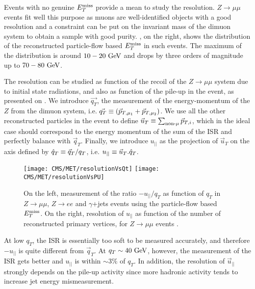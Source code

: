     Events with no genuine $E_T^\text{miss}$ provide a mean to study the resolution.
    $Z \rightarrow \mu\mu$ events fit well this purpose as muons are well-identified objects
    with a good resolution and a constraint can be put on the invariant mass of the
    dimuon system to obtain a sample with good purity. ,
    on the right, shows the distribution of the reconstructed particle-flow based
    $E_T^\text{miss}$ in such events. The maximum of the distribution is around $10-20~\text{GeV}$ and
    drops by three orders of magnitude up to $70-80~\text{GeV}$.

    The resolution can be studied as function of the recoil of the $Z \rightarrow \mu\mu$
    system due to initial state radiations, and also as function of the pile-up in the
    event, as presented on . We introduce $\vec{q_T}$,
    the measurement of the energy-momentum of the $Z$ from the dimuon system, i.e.
    $\vec{q_T} \equiv (\vec{p}_{T,\mu_1} + \vec{p}_{T,\mu_2})$. We use all the other
    reconstructed particles in the event to define $\vec{u}_T \equiv \sum_{\text{non-}\mu} \vec{p}_{T,i}$,
    which in the ideal case should correspond to the energy momentum of the sum of the
    ISR and perfectly balance with $\vec{q}_T$. Finally, we introduce $u_{||}$ as the
    projection of $\vec{u}_T$ on the axis defined by $\hat{q}_T \equiv \vec{q}_T
    / q_T$, i.e. $u_{||} \equiv \vec{u}_T . \hat{q}_T$.

    \begin{figure}[h!]
        \centering
        \texttt{[image: CMS/MET/resolutionVsQt]}
        \texttt{[image: CMS/MET/resolutionVsPU]}
        \caption{On the left, measurement of the ratio $-u_{||}/q_T$ as function of $q_T$
        in $Z\rightarrow\mu\mu$, $Z\rightarrow e e$ and $\gamma$+jets events using
        the particle-flow based $E_T^\text{miss}$. On the right, resolution of
        $u_{||}$ as function of the number of reconstructed primary vertices, for
        $Z\rightarrow\mu\mu$ events \cite{METperf}.}
        \label{fig:METresolution}
    \end{figure}

    At low $q_T$, the ISR is essentially too soft to be measured accurately, and
    therefore $- u_{||}$ is quite different from $\vec{q}_T$. At $q_T \sim 40~\text{GeV}$,
    however, the measurement of the ISR gets better and $u_{||}$ is within $\sim 3\%$
    of $q_T$. In addition, the resolution of $\vec{u}_{||}$ strongly depends on the
    pile-up activity since more hadronic activity tends to increase jet energy
    mismeasurement.

